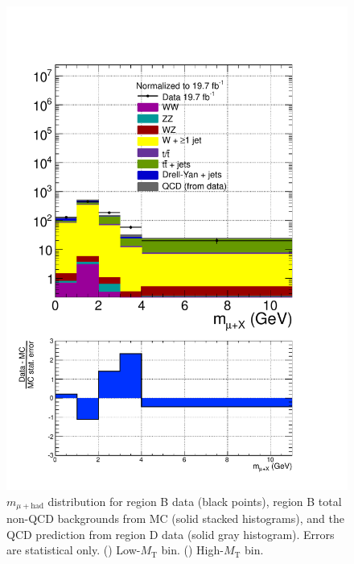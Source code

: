 \begin{figure}[hbtp]
\begin{center}
    \includegraphics[width=\cmsFigWidth]{figures/dataVsMCQCD_muHadMass_highMT_v87}
    \caption{$m_{\mu+\text{had}}$ distribution for region B data (black points), region B total non-QCD backgrounds from MC (solid stacked histograms), and the QCD prediction from region D data (solid gray histogram).  Errors are statistical only. (\cmsLeft) Low-$M_{\text{T}}$ bin. (\cmsRight) High-$M_{\text{T}}$ bin.}
    \label{fig:regB-data-MC-muHadMass}
  \end{center}
\end{figure}

